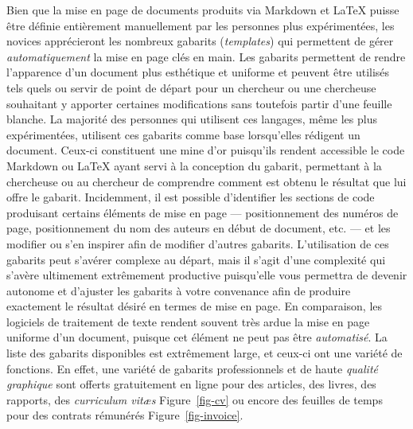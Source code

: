 \documentclass[
  letterpaper,
  DIV=11,
  numbers=noendperiod]{scrreprt}
\begin{document}
Bien que la mise en page de documents produits via Markdown et LaTeX
puisse être définie entièrement manuellement par les personnes plus
expérimentées, les novices apprécieront les nombreux gabarits
(\emph{templates}) qui permettent de gérer \emph{automatiquement} la
mise en page clés en main. Les gabarits permettent de rendre l'apparence
d'un document plus esthétique et uniforme et peuvent être utilisés tels
quels ou servir de point de départ pour un chercheur ou une chercheuse
souhaitant y apporter certaines modifications sans toutefois partir
d'une feuille blanche. La majorité des personnes qui utilisent ces
langages, même les plus expérimentées, utilisent ces gabarits comme base
lorsqu'elles rédigent un document. Ceux-ci constituent une mine d'or
puisqu'ils rendent accessible le code Markdown ou LaTeX ayant servi à la
conception du gabarit, permettant à la chercheuse ou au chercheur de
comprendre comment est obtenu le résultat que lui offre le gabarit.
Incidemment, il est possible d'identifier les sections de code
produisant certains éléments de mise en page --- positionnement des
numéros de page, positionnement du nom des auteurs en début de document,
etc. --- et les modifier ou s'en inspirer afin de modifier d'autres
gabarits. L'utilisation de ces gabarits peut s'avérer complexe au
départ, mais il s'agit d'une complexité qui s'avère ultimement
extrêmement productive puisqu'elle vous permettra de devenir autonome et
d'ajuster les gabarits à votre convenance afin de produire exactement le
résultat désiré en termes de mise en page. En comparaison, les logiciels
de traitement de texte rendent souvent très ardue la mise en page
uniforme d'un document, puisque cet élément ne peut pas être
\emph{automatisé}. La liste des gabarits disponibles est extrêmement
large, et ceux-ci ont une variété de fonctions. En effet, une variété de
gabarits professionnels et de haute \emph{qualité graphique} sont
offerts gratuitement en ligne pour des articles, des livres, des
rapports, des \emph{curriculum vitæs} Figure~\ref{fig-cv} ou encore des
feuilles de temps pour des contrats rémunérés Figure~\ref{fig-invoice}.
\end{document}

